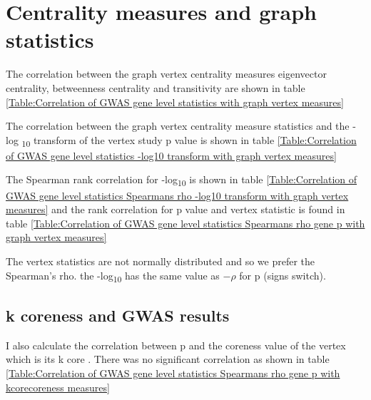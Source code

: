 \section{Centrality measures and graph statistics}

The correlation between the graph vertex centrality measures eigenvector centrality, betweenness centrality and transitivity are shown in table \ref{Table:Correlation of GWAS gene level statistics with graph vertex measures}

The correlation between the graph vertex centrality measure statistics and the -log \textsubscript{10} transform of the vertex study p value is shown in table \ref{Table:Correlation of GWAS gene level statistics -log10 transform with graph vertex measures}

The Spearman rank correlation for -log\textsubscript{10} is shown in table \ref{Table:Correlation of GWAS gene level statistics Spearmans rho -log10 transform with graph vertex measures} and the rank correlation for p value and vertex statistic is found in table \ref{Table:Correlation of GWAS gene level statistics Spearmans rho gene p  with graph vertex measures} 

The vertex statistics are not normally distributed  and so we prefer the Spearman's rho. the -log\textsubscript{10} has the same value as $-\rho$ for p (signs switch).



 \subsection{k coreness and GWAS results}
I also calculate the correlation between p and the coreness value of the vertex which is its k core . There was no significant correlation as shown in table \ref{Table:Correlation of GWAS gene level statistics Spearmans rho gene p  with kcorecoreness measures}

